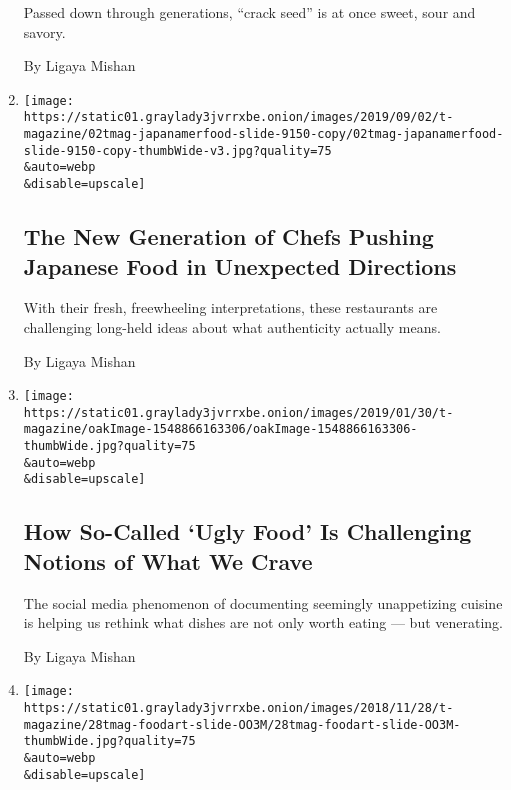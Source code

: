 \begin{enumerate}
  Passed down through generations, ``crack seed'' is at once sweet, sour
  and savory.

  By Ligaya Mishan
\item
  \href{/2019/09/02/t-magazine/japanese-american-food.html}{}

  \texttt{[image: https://static01.graylady3jvrrxbe.onion/images/2019/09/02/t-magazine/02tmag-japanamerfood-slide-9150-copy/02tmag-japanamerfood-slide-9150-copy-thumbWide-v3.jpg?quality=75\\\&auto=webp\\\&disable=upscale]}

  \hypertarget{the-new-generation-of-chefs-pushing-japanese-food-in-unexpected-directions}{%
  \subsection{The New Generation of Chefs Pushing Japanese Food in
  Unexpected
  Directions}\label{the-new-generation-of-chefs-pushing-japanese-food-in-unexpected-directions}}

  With their fresh, freewheeling interpretations, these restaurants are
  challenging long-held ideas about what authenticity actually means.

  By Ligaya Mishan
\item
  \href{/2019/02/14/t-magazine/dark-cuisine-ugly-food.html}{}

  \texttt{[image: https://static01.graylady3jvrrxbe.onion/images/2019/01/30/t-magazine/oakImage-1548866163306/oakImage-1548866163306-thumbWide.jpg?quality=75\\\&auto=webp\\\&disable=upscale]}

  \hypertarget{how-so-called-ugly-food-is-challenging-notions-of-what-we-crave}{%
  \subsection{How So-Called `Ugly Food' Is Challenging Notions of What
  We
  Crave}\label{how-so-called-ugly-food-is-challenging-notions-of-what-we-crave}}

  The social media phenomenon of documenting seemingly unappetizing
  cuisine is helping us rethink what dishes are not only worth eating
  --- but venerating.

  By Ligaya Mishan
\item
  \href{/2018/11/29/t-magazine/food-as-art.html}{}

  \texttt{[image: https://static01.graylady3jvrrxbe.onion/images/2018/11/28/t-magazine/28tmag-foodart-slide-OO3M/28tmag-foodart-slide-OO3M-thumbWide.jpg?quality=75\\\&auto=webp\\\&disable=upscale]}


\end{enumerate}
